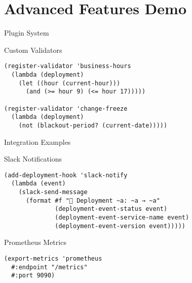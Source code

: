 \documentclass[presentation]{beamer}
\begin{document}
\section{Advanced Features Demo}
\label{sec:orge18578d}
\begin{frame}[label={sec:orga5f83d3},fragile]{Plugin System}
 \begin{block}{Custom Validators}
\begin{verbatim}
(register-validator 'business-hours
  (lambda (deployment)
    (let ((hour (current-hour)))
      (and (>= hour 9) (<= hour 17)))))

(register-validator 'change-freeze
  (lambda (deployment)
    (not (blackout-period? (current-date)))))
\end{verbatim}
\end{block}
\end{frame}
\begin{frame}[label={sec:org9ea03d1},fragile]{Integration Examples}
 \begin{block}{Slack Notifications}
\begin{verbatim}
(add-deployment-hook 'slack-notify
  (lambda (event)
    (slack-send-message
      (format #f "🚀 Deployment ~a: ~a → ~a"
              (deployment-event-status event)
              (deployment-event-service-name event)
              (deployment-event-version event)))))
\end{verbatim}
\end{block}
\begin{block}{Prometheus Metrics}
\begin{verbatim}
(export-metrics 'prometheus
  #:endpoint "/metrics"
  #:port 9090)
\end{verbatim}
\end{block}
\end{frame}
\end{document}
